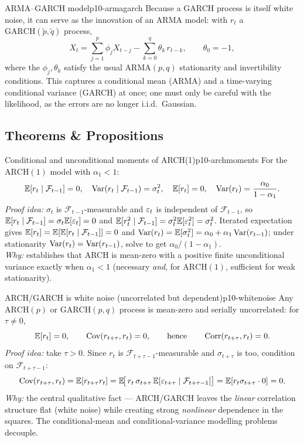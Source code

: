 \begin{definition}{ARMA--GARCH model}{p10-armagarch}
Because a GARCH process is itself white noise, it can serve as the innovation of
an ARMA model: with $r_t$ a $\mathrm{GARCH}(\tilde p,\tilde q)$ process,
\[
X_t=\sum_{j=1}^{p}\phi_j X_{t-j}-\sum_{k=0}^{q}\theta_k\,r_{t-k},
\qquad \theta_0=-1,
\]
where the $\phi_j,\theta_k$ satisfy the usual $\mathrm{ARMA}(p,q)$ stationarity
and invertibility conditions. This captures a conditional mean (ARMA) and a
time-varying conditional variance (GARCH) at once; one must only be careful with
the likelihood, as the errors are no longer i.i.d.\ Gaussian.
\end{definition}

\subsection{Theorems \& Propositions}

\begin{proposition}{Conditional and unconditional moments of ARCH(1)}{p10-archmoments}
For the $\mathrm{ARCH}(1)$ model with $\alpha_1<1$:
\[
\mathbb{E}[r_t\mid\mathcal F_{t-1}]=0,\quad
\operatorname{Var}(r_t\mid\mathcal F_{t-1})=\sigma_t^2,\quad
\mathbb{E}[r_t]=0,\quad
\operatorname{Var}(r_t)=\frac{\alpha_0}{1-\alpha_1}.
\]
\textit{Proof idea:} $\sigma_t$ is $\mathcal F_{t-1}$-measurable and $\varepsilon_t$ is
independent of $\mathcal F_{t-1}$, so
$\mathbb{E}[r_t\mid\mathcal F_{t-1}]=\sigma_t\mathbb{E}[\varepsilon_t]=0$ and
$\mathbb{E}[r_t^2\mid\mathcal F_{t-1}]=\sigma_t^2\mathbb{E}[\varepsilon_t^2]=\sigma_t^2$. Iterated
expectation gives $\mathbb{E}[r_t]=\mathbb{E}[\mathbb{E}[r_t\mid\mathcal F_{t-1}]]=0$ and
$\operatorname{Var}(r_t)=\mathbb{E}[\sigma_t^2]=\alpha_0+\alpha_1\operatorname{Var}(r_{t-1})$; under stationarity
$\operatorname{Var}(r_t)=\operatorname{Var}(r_{t-1})$, solve to get $\alpha_0/(1-\alpha_1)$.\\
\textit{Why:} establishes that ARCH is mean-zero with a positive finite
unconditional variance exactly when $\alpha_1<1$ (necessary \emph{and}, for
$\mathrm{ARCH}(1)$, sufficient for weak stationarity).
\end{proposition}

\begin{proposition}{ARCH/GARCH is white noise (uncorrelated but dependent)}{p10-whitenoise}
Any $\mathrm{ARCH}(p)$ or $\mathrm{GARCH}(p,q)$ process is mean-zero and serially
uncorrelated: for $\tau\ne0$,
\[
\mathbb{E}[r_t]=0,\qquad \operatorname{Cov}(r_{t+\tau},r_t)=0,\qquad\text{hence}\qquad \operatorname{Corr}(r_{t+\tau},r_t)=0 .
\]
\textit{Proof idea:} take $\tau>0$. Since $r_t$ is
$\mathcal F_{t+\tau-1}$-measurable and $\sigma_{t+\tau}$ is too, condition on
$\mathcal F_{t+\tau-1}$:
\[
\operatorname{Cov}(r_{t+\tau},r_t)=\mathbb{E}[r_{t+\tau}r_t]
=\mathbb{E}\!\big[\,r_t\,\sigma_{t+\tau}\,\mathbb{E}[\varepsilon_{t+\tau}\mid\mathcal F_{t+\tau-1}]\big]
=\mathbb{E}[r_t\sigma_{t+\tau}\cdot 0]=0 .
\]
\textit{Why:} the central qualitative fact --- ARCH/GARCH leaves the
\emph{linear} correlation structure flat (white noise) while creating strong
\emph{nonlinear} dependence in the squares. The conditional-mean and
conditional-variance modelling problems decouple.
\end{proposition}

